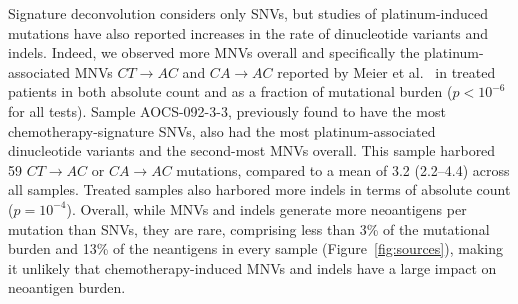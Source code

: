 Signature deconvolution considers only SNVs, but studies of platinum-induced mutations have also reported increases in the rate of dinucleotide variants and indels. Indeed, we observed more MNVs overall and specifically the platinum-associated MNVs $CT \rightarrow AC$ and $CA \rightarrow AC$ reported by Meier et al.~\cite{Meier_2014} in treated patients in both absolute count and as a fraction of mutational burden ($p < 10^{-6}$ for all tests). Sample AOCS-092-3-3, previously found to have the most chemotherapy-signature SNVs, also had the most platinum-associated dinucleotide variants and the second-most MNVs overall. This sample harbored 59 $CT \rightarrow AC$ or $CA \rightarrow AC$ mutations, compared to a mean of 3.2 (2.2--4.4) across all samples. Treated samples also harbored more indels in terms of absolute count ($p=10^{-4}$). Overall, while MNVs and indels generate more neoantigens per mutation than SNVs, they are rare, comprising less than 3\% of the mutational burden and 13\% of the neantigens in every sample (Figure~\ref{fig:sources}), making it unlikely that chemotherapy-induced MNVs and indels have a large impact on neoantigen burden.

